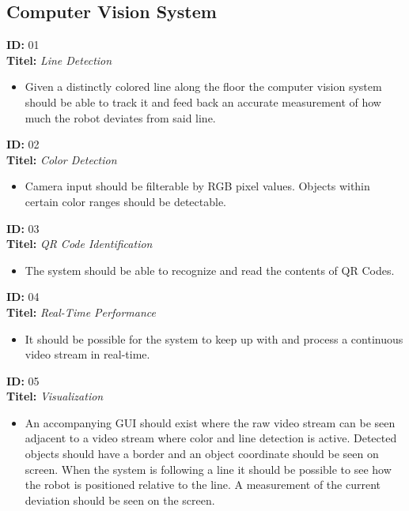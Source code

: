 \subsection*{Computer Vision System}
\textbf{ID:} 01 \\
\textbf{Titel:} \emph{Line Detection}
\begin{itemize}
    \item Given a distinctly colored line along the floor the computer vision system should be able to track it and
    feed back an accurate measurement of how much the robot deviates from said line.
\end{itemize}
\textbf{ID:} 02 \\
\textbf{Titel:} \emph{Color Detection}
\begin{itemize}
    \item Camera input should be filterable by RGB pixel values. Objects within certain color ranges should be detectable.
\end{itemize}
\textbf{ID:} 03 \\
\textbf{Titel:} \emph{QR Code Identification}
\begin{itemize}
    \item The system should be able to recognize and read the contents of QR Codes.
\end{itemize}
\textbf{ID:} 04 \\
\textbf{Titel:} \emph{Real-Time Performance}
\begin{itemize}
    \item It should be possible for the system to keep up with and process a continuous video stream in real-time.
\end{itemize}
\textbf{ID:} 05 \\
\textbf{Titel:} \emph{Visualization}
\begin{itemize}
    \item An accompanying GUI should exist where the raw video stream can be seen adjacent to a video stream where color
    and line detection is active. Detected objects should have a border and an object coordinate should be seen on screen.
    When the system is following a line it should be possible to see how the robot is positioned relative to the line.
    A measurement of the current deviation should be seen on the screen.
\end{itemize}